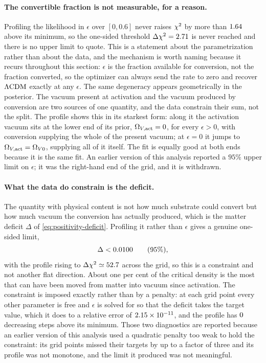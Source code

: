 \paragraph{The convertible fraction is not measurable, for a reason.}
Profiling the likelihood in $\epsilon$ over $[0,0.6]$ never raises $\chi^{2}$ by
more than $1.64$ above its minimum, so the
one-sided threshold $\Delta\chi^{2}=2.71$ is never reached and there is no upper
limit to quote. This is a statement about the parametrization rather than about
the data, and the mechanism is worth naming because it recurs throughout this
section: $\epsilon$ is the fraction available for conversion, not the fraction
converted, so the optimizer can always send the rate to zero and recover
$\Lambda\mathrm{CDM}$ exactly at any $\epsilon$. The same degeneracy appears geometrically in
the posterior. The vacuum present at activation and the vacuum produced by
conversion are two sources of one quantity, and the data constrain their sum,
not the split. The profile shows this in its starkest form: along it the
activation vacuum sits at the lower end of its prior, $\Omega_{V,\rm act}=0$,
for every $\epsilon>0$, with conversion supplying the whole of the present
vacuum; at $\epsilon=0$ it jumps to $\Omega_{V,\rm act}=\Omega_{V0}$, supplying
all of it itself. The fit is equally good at both ends because it is the same
fit. An earlier version of this analysis
reported a $95\%$ upper limit on $\epsilon$; it was the right-hand end of the
grid, and it is withdrawn.

\paragraph{What the data do constrain is the deficit.} The quantity with
physical content is not how much substrate could convert but how much vacuum
the conversion has actually produced, which is the matter deficit $\Delta$ of
\cref{eq:positivity-deficit}. Profiling it rather than $\epsilon$ gives a
genuine one-sided limit,
\begin{equation}\label{eq:observations-deficit-limit}
  \Delta < 0.0100 \qquad (95\%),
\end{equation}
with the profile rising to $\Delta\chi^{2}\simeq52.7$
across the grid, so this is a constraint and not another flat direction. About
one per cent of the critical density is the most that can have been moved from
matter into vacuum since activation. The constraint is imposed exactly rather
than by a penalty: at each grid point every other parameter is free and
$\epsilon$ is solved for so that the deficit takes the target value, which it
does to a relative error of
$\num{2.15e-11}$, and the profile has
$0$ decreasing steps above
its minimum. Those two diagnostics are reported because an earlier version of
this analysis used a quadratic penalty too weak to hold the constraint: its
grid points missed their targets by up to a factor of three and its profile was
not monotone, and the limit it produced was not meaningful.

